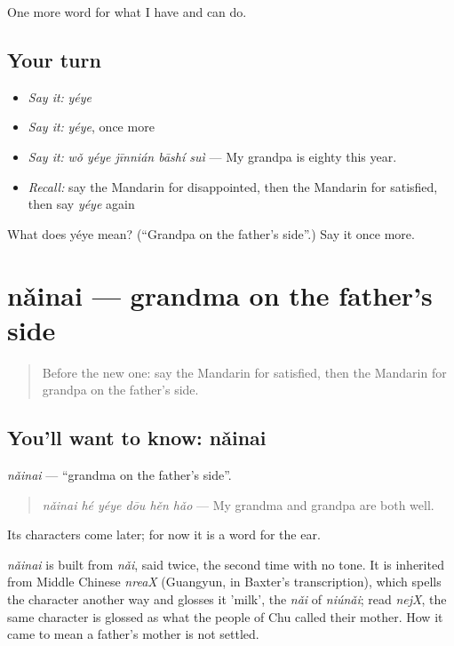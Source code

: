 \begin{grammarlens}[title={What you've built}]
One more word for what I have and can do.
\end{grammarlens}

\subsection*{Your turn}
\begin{itemize}
\raggedright
  \item \emph{Say it:} \emph{yéye}
  \item \emph{Say it:} \emph{yéye}, once more
  \item \emph{Say it:} \emph{wǒ yéye jīnnián bāshí suì} — My grandpa is eighty this year.
  \item \emph{Recall:} say the Mandarin for disappointed, then the Mandarin for satisfied, then say \emph{yéye} again
\end{itemize}

\begin{tcolorbox}[breakable,colback=teal!4,colframe=teal!35!black,title={Before you move on}]
What does yéye mean? (\textquotedblleft{}Grandpa on the father's side\textquotedblright{}.) Say it once more.
\end{tcolorbox}
\section[nǎinai]{nǎinai — grandma on the father's side}

\label{lesson:ZH-C253-nainai}



\begin{quote}
Before the new one: say the Mandarin for satisfied, then the Mandarin for grandpa on the father's side.
\end{quote}

\subsection*{You'll want to know: nǎinai}
\emph{nǎinai} — \textquotedblleft{}grandma on the father's side\textquotedblright{}.

\begin{quote}
\emph{nǎinai hé yéye dōu hěn hǎo} — My grandma and grandpa are both well.
\end{quote}

Its characters come later; for now it is a word for the ear.

\begin{cousinweb}
\emph{nǎinai} is built from \emph{nǎi}, said twice, the second time with no tone. It is inherited from Middle Chinese \emph{nreaX} (Guangyun, in Baxter's transcription), which spells the character another way and glosses it 'milk', the \emph{nǎi} of \emph{niúnǎi}; read \emph{nejX}, the same character is glossed as what the people of Chu called their mother. How it came to mean a father's mother is not settled.
\end{cousinweb}


